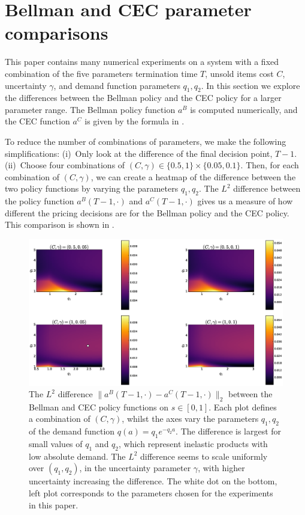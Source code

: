 \documentclass[main.tex]{subfiles}
\begin{document}
\listoftodos

\section{Bellman and CEC parameter comparisons}\label{sec:parameter_comparison}
This paper contains many numerical experiments on a system
with a fixed combination of the five parameters
termination time $T$, unsold items cost $C$, uncertainty $\gamma$, and
demand function parameters $q_1,q_2$.
In this section we explore the differences between the Bellman policy
and the CEC policy for a larger parameter range.
The Bellman policy function $a^B$ is computed numerically, and
the CEC function $a^C$ is given by the formula in
.

To reduce the number of combinations of parameters, we make the
following simplifications:
(i)~Only look at the difference of the final decision point, $T-1$.
(ii)~Choose four combinations of
$(C,\gamma)\in\{0.5,1\}\times\{0.05,0.1\}$.
Then,
for each combination of $(C,\gamma)$,
we can create a heatmap of the difference between the two policy
functions by varying the parameters $q_1,q_2$.
The $L^2$ difference between the
policy function $a^B(T-1,\cdot)$ and $a^C(T-1,\cdot)$
gives us a measure of how different the pricing decisions are for
the Bellman policy and the CEC policy.
This comparison is shown in .
\begin{figure}[htbp]
  \includegraphics[width=1\textwidth]{./img/policy_diff_heatmaps}
  \caption{The $L^2$ difference $\|a^B(T-1,\cdot)-a^C(T-1,\cdot)\|_2$
    between the Bellman and CEC policy functions on $s\in[0,1]$.
    Each plot defines a combination of $(C,\gamma)$, whilst
    the axes vary the parameters $q_1,q_2$ of the demand function
    $q(a)=q_1e^{-q_2a}$.
    The difference is largest for small values of $q_1$ and $q_2$,
    which represent inelastic products with low absolute demand.
    The $L^2$ difference seems to scale uniformly over $(q_1,q_2)$, in the uncertainty
    parameter $\gamma$, with higher uncertainty increasing the
    difference.
    The white dot on the bottom, left plot corresponds to the
    parameters chosen for the experiments in this paper.
  }\label{fig:policy_diff_heatmaps}
\end{figure}
\end{document}
